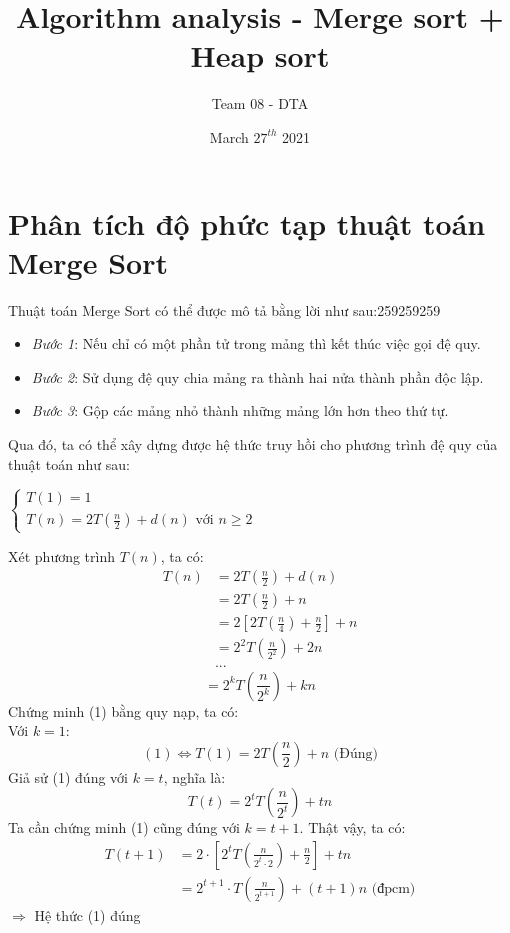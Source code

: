 \documentclass{article}
\title{Algorithm analysis - Merge sort + Heap sort}
\author{Team 08 - DTA}
\date{March $27^{th}$ 2021}
\begin{document}
\maketitle
\section{Phân tích độ phức tạp thuật toán Merge Sort}
\begin{multicols}{2}
\vfill
Thuật toán Merge Sort có thể được mô tả bằng lời như sau:259259259
\begin{itemize}
    \item \textit{Bước 1}: Nếu chỉ có một phần tử trong mảng thì kết thúc việc gọi đệ quy.
    \item \textit{Bước 2}: Sử dụng đệ quy chia mảng ra thành hai nửa thành phần độc lập.
    \item \textit{Bước 3}: Gộp các mảng nhỏ thành những mảng lớn hơn theo thứ tự. 
\end{itemize}
Qua đó, ta có thể xây dựng được hệ thức truy hồi cho phương trình đệ quy của thuật toán như sau:
\begin{center} 
$\begin{cases}
    T(1) = 1 \\ T(n) = 2T(\frac{n}{2}) + d(n) \text{ với }n \geq 2
\end{cases}$
\end{center}
Xét phương trình $T(n)$, ta có:
\begin{align*}
    T\left(n\right) &= 2T\left(\frac{n}{2}\right) + d\left(n\right)\\
    &= 2T\left(\frac{n}{2}\right) + n\\
    &= 2\left[2T\left(\frac{n}{4} \right) + \frac{n}{2}\right] + n \\
    &= 2^{2}T\left(\frac{n}{2^2}\right) + 2n\\
    &...
\end{align*}
\begin{equation}
     = 2^{k}T\left(\frac{n}{2^k}\right) + kn
\end{equation}
Chứng minh (1) bằng quy nạp, ta có: \\
Với $k = 1$:
\begin{equation*}
    (1) \Leftrightarrow T(1) = 2T\left(\frac{n}{2}\right)+ n \text{ (Đúng)}
\end{equation*}
Giả sử (1) đúng với $k = t$, nghĩa là:
\begin{equation*}
    T(t) = 2^{t}T\left(\frac{n}{2^t}\right) + tn
\end{equation*}
Ta cần chứng minh (1) cũng đúng với $k = t + 1$. Thật vậy, ta có:
\begin{align*}
     T(t + 1) &= 2\cdot\left[2^{t}T\left(\frac{n}{2^{t}\cdot 2}\right) + \frac{n}{2}\right] + tn\\
     &= 2^{t + 1}\cdot T\left(\frac{n}{2^{t + 1}}\right) + \left(t + 1\right)n \text{ (đpcm)}
\end{align*}
$\Rightarrow$ Hệ thức (1) đúng \\


\end{multicols}
\end{document}
